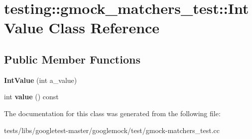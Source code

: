 \hypertarget{classtesting_1_1gmock__matchers__test_1_1IntValue}{}\section{testing\+:\+:gmock\+\_\+matchers\+\_\+test\+:\+:Int\+Value Class Reference}
\label{classtesting_1_1gmock__matchers__test_1_1IntValue}
\subsection*{Public Member Functions}
\begin{DoxyCompactItemize}
\item 
\mbox{\label{classtesting_1_1gmock__matchers__test_1_1IntValue_a2a294fcf7ad9f4d9888c4e6194fcd848}} 
{\bfseries Int\+Value} (int a\+\_\+value)
\item 
\mbox{\label{classtesting_1_1gmock__matchers__test_1_1IntValue_a6da000ea8ff787591e07ffaa3c1027d4}} 
int {\bfseries value} () const
\end{DoxyCompactItemize}


The documentation for this class was generated from the following file\+:\begin{DoxyCompactItemize}
\item 
tests/libs/googletest-\/master/googlemock/test/gmock-\/matchers\+\_\+test.\+cc\end{DoxyCompactItemize}
